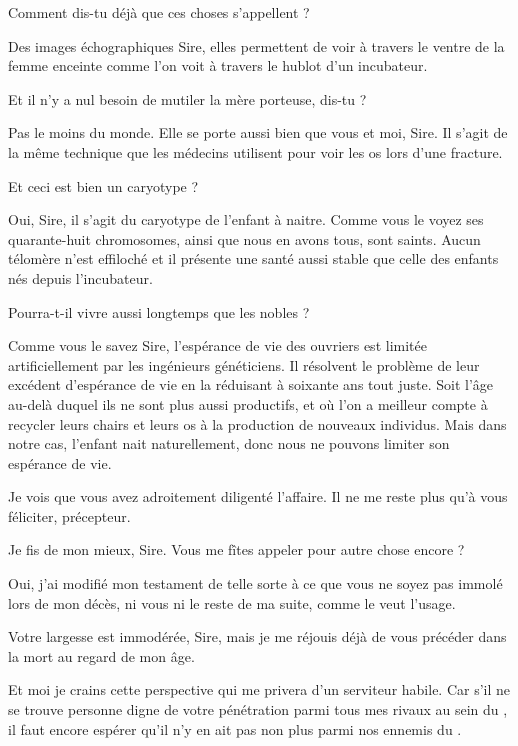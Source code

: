 \begin{drama}
  \elenaspeaks {} Comment dis-tu déjà que ces choses s’appellent ?

  \alexasspeaks Des images échographiques Sire, elles permettent de voir à travers le ventre de la femme enceinte comme l’on voit à travers le hublot d’un incubateur.

  \elenaspeaks Et il n’y a nul besoin de mutiler la mère porteuse, dis-tu ?

  \alexasspeaks Pas le moins du monde. Elle se porte aussi bien que vous et moi, Sire. Il s’agit de la même technique que les médecins utilisent pour voir les os lors d’une fracture.

  \elenaspeaks Et ceci est bien un caryotype ?

  \alexasspeaks Oui, Sire, il s’agit du caryotype de l’enfant à naitre. Comme vous le voyez ses quarante-huit chromosomes, ainsi que nous en avons tous, sont saints. Aucun télomère n’est effiloché et il présente une santé aussi stable que celle des enfants nés depuis l’incubateur. 

  \elenaspeaks Pourra-t-il vivre aussi longtemps que les nobles ?

  \alexasspeaks Comme vous le savez Sire, l’espérance de vie des ouvriers  est limitée artificiellement par les ingénieurs généticiens. Il résolvent le problème de leur excédent d’espérance de vie en la réduisant à soixante ans tout juste. Soit l’âge au-delà duquel ils ne sont plus aussi productifs, et où l’on a meilleur compte à recycler leurs chairs et leurs os à la production de nouveaux individus. Mais dans notre cas, l’enfant nait naturellement, donc nous ne pouvons limiter son espérance de vie.

  \elenaspeaks Je vois que vous avez adroitement diligenté l’affaire. Il ne me reste plus qu’à vous féliciter, précepteur.

  \alexasspeaks Je fis de mon mieux, Sire. Vous me fîtes appeler pour autre chose encore ?

  \elenaspeaks Oui, j’ai modifié mon testament de telle sorte à ce que vous ne soyez pas immolé lors de mon décès, ni vous ni le reste de ma suite, comme le veut l’usage.

  \alexasspeaks Votre largesse est immodérée, Sire, mais je me réjouis déjà de vous précéder dans la mort au regard de mon âge.

  \elenaspeaks Et moi je crains cette perspective qui me privera d’un serviteur habile. Car s’il ne se trouve personne digne de votre pénétration parmi tous mes rivaux au sein du \campprincipal{}, il faut encore espérer qu’il n’y en ait pas non plus parmi nos ennemis du \campoppose{}.


\end{drama}
